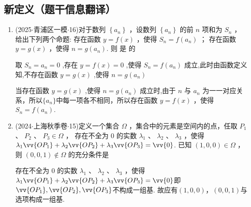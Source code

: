 \subsection*{新定义（题干信息翻译）}
\begin{enumerate}
    \item (2025$\cdot$青浦区一模$\cdot$16)对于数列 $\left\{  {a}_{n}\right\}$ ，设数列 $\left\{  {a}_{n}\right\}$ 的前 $n$ 项和为 ${S}_{n}$ ，给出下列两个命题:   存在函数 $y = f\left( x\right)$ ，使得 ${S}_{n} = f\left( {a}_{n}\right)$ ；   存在函数 $y = g\left( x\right)$ ，使得 $n = g\left( {a}_{n}\right)$. 则  是  的 
    \begin{jieda}
        取 ${S}_{n} = {a}_{n} = 0$ ,存在 $y = f\left( x\right)  = 0$ ,使得 ${S}_{n} = f\left( {a}_{n}\right)$ 成立,此时由函数定义知,不存在函数 $y = g\left( x\right)$ ,使得 $n =  g\left( {a}_{n}\right)$
        
        当存在函数 $y = g\left( x\right)$ ,使得 $n = g\left( {a}_{n}\right)$ 成立时,由于 $n$ 与 ${a}_{n}$ 为一一对应关系，所以$\{a_n\}$中每一项各不相同，所以存在函数 $y = f\left( x\right)$ ，使得 ${S}_{n} = f\left( {a}_{n}\right)$.
    \end{jieda}

    \item (2024$\cdot$上海秋季卷$\cdot$15)定义一个集合 $\Omega$ ，集合中的元素是空间内的点，任取 ${P}_{1}$ 、 ${P}_{2}$ 、 ${P}_{3} \in  \Omega$ ， 存在不全为 0 的实数 ${\lambda }_{1}$ 、 ${\lambda }_{2}$ 、 ${\lambda }_{3}$ ，使得 ${\lambda }_{1}\vv{O{P}_{1}} + {\lambda }_{2}\vv{O{P}_{2}} + {\lambda }_{3}\vv{O{P}_{3}} = \vv{0}$. 已知 $\left( {1,0,0}\right)  \in  \Omega$ ，则 $\left( {0,0,1}\right)  \notin  \Omega$ 的充分条件是 
    \begin{jieda}
        存在不全为 0 的实数 ${\lambda }_{1}$ 、 ${\lambda }_{2}$ 、 ${\lambda }_{3}$ ，使得 ${\lambda }_{1}\vv{O{P}_{1}} + {\lambda }_{2}\vv{O{P}_{2}} + {\lambda }_{3}\vv{O{P}_{3}} = \vv{0}$即$\vv{O{P}_{1}}, \vv{O{P}_{2}}, \vv{O{P}_{3}}$不构成一组基. 故应有$\left( {1,0,0}\right)，\left( {0,0,1}\right)$与选项构成一组基.
    \end{jieda}



\end{enumerate}
